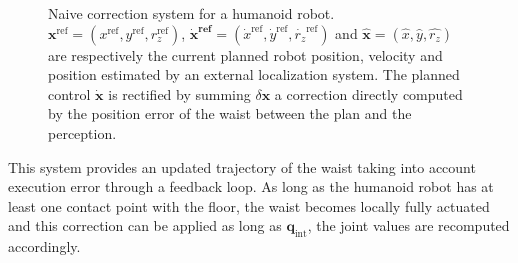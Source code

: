\begin{figure}[ht!]
  \begin{center}
  \end{center}
  \caption{Naive correction system for a humanoid
    robot. $\mathbf{x}^{\text{ref}} = (x^{\text{ref}}, y^{\text{ref}},
    r_z^{\text{ref}})$, $\mathbf{\dot{x}^{\text{ref}}} =
    (\dot{x}^{\text{ref}}, \dot{y}^{\text{ref}},
    \dot{r_z}^{\text{ref}})$ and $\mathbf{\hat{x}} = (\hat{x},
    \hat{y}, \hat{r_z})$ are respectively the current planned robot
    position, velocity and position estimated by an external
    localization system. The planned control $\mathbf{\dot{x}}$ is
    rectified by summing $\delta \mathbf{x}$ a correction directly
    computed by the position error of the waist between the plan and
    the perception. \label{fig:system}}
\end{figure}


This system provides an updated trajectory of the waist taking into
account execution error through a feedback loop. As long as the
humanoid robot has at least one contact point with the floor, the
waist becomes locally fully actuated and this correction can be applied
as long as $\mathbf{q}_{\text{int}}$, the joint values are recomputed
accordingly.


